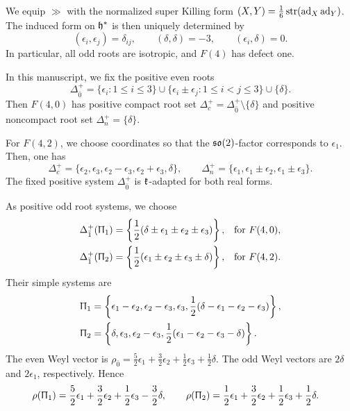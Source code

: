 We equip $\gg$ with the normalized super Killing form
$(X,Y)=\frac16\operatorname{str}(\operatorname{ad}_X\operatorname{ad}_Y)$. The induced form on ${\mathfrak h}^*$
is then uniquely determined by
\begin{equation}
(\epsilon_i,\epsilon_j)=\delta_{ij},
\qquad
(\delta,\delta)=-3,
\qquad
(\epsilon_i,\delta)=0.
\end{equation}
In particular, all odd roots are isotropic, and $F(4)$ has defect one.

In this manuscript, we fix the positive even roots
\begin{equation}\label{eq::F4_positive_even_roots}
\Delta_{\bar0}^+
=
\{\epsilon_i:1\leq i\leq3\}
\cup
\{\epsilon_i\pm\epsilon_j:1\leq i<j\leq3\}
\cup\{\delta\}.
\end{equation}
Then $F(4,0)$ has positive compact root set 
$\Delta_c^+=\Delta_{\bar0}^+\setminus\{\delta\}$ and positive noncompact root set
$\Delta_n^+=\{\delta\}$.

For $F(4,2)$, we choose coordinates so that the ${\mathfrak{so}}(2)$-factor corresponds to $\epsilon_1$. Then, one has \begin{equation}
\Delta_c^+
=
\{\epsilon_2,\epsilon_3,\epsilon_2-\epsilon_3,
\epsilon_2+\epsilon_3,\delta\},
\qquad
\Delta_n^+
=
\{\epsilon_1,\epsilon_1\pm\epsilon_2,\epsilon_1\pm\epsilon_3\}.
\end{equation}
The fixed positive system $\Delta_{\bar{0}}^{+}$ is ${\mathfrak k}$-adapted for
both real forms.

As positive odd root systems, we choose
\begin{equation}\label{eq::F4_positive_odd_roots}
\begin{aligned}
\Delta_{\bar1}^+(\Uppi_1)
&=
\left\{
\frac12(\delta\pm\epsilon_1\pm\epsilon_2\pm\epsilon_3)
\right\},
&&\text{for }F(4,0),\\
\Delta_{\bar1}^+(\Uppi_2)
&=
\left\{
\frac12(\epsilon_1\pm\epsilon_2\pm\epsilon_3\pm\delta)
\right\},
&&\text{for }F(4,2).
\end{aligned}
\end{equation}
Their simple systems are
\begin{equation}\label{eq::F4_simple_systems}
\begin{aligned}
\Uppi_1
&=
\left\{
\epsilon_1-\epsilon_2,\epsilon_2-\epsilon_3,\epsilon_3,
\frac12(\delta-\epsilon_1-\epsilon_2-\epsilon_3)
\right\},\\
\Uppi_2
&=
\left\{
\delta,\epsilon_3,\epsilon_2-\epsilon_3,
\frac12(\epsilon_1-\epsilon_2-\epsilon_3-\delta)
\right\}.
\end{aligned}
\end{equation}
The even Weyl vector is
$\rho_{\bar0}=\frac52\epsilon_1+\frac32\epsilon_2+
\frac12\epsilon_3+\frac12\delta$.
The odd Weyl vectors are $2\delta$ and $2\epsilon_1$,
respectively. Hence
\begin{equation}
\begin{aligned}
\rho(\Uppi_1)
&=
\frac52\epsilon_1+\frac32\epsilon_2+
\frac12\epsilon_3-\frac32\delta,\qquad 
\rho(\Uppi_2)
=
\frac12\epsilon_1+\frac32\epsilon_2+
\frac12\epsilon_3+\frac12\delta.
\end{aligned}
\end{equation}

